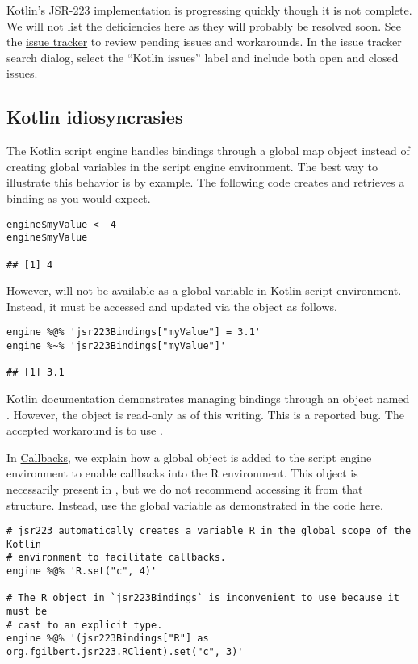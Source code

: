 Kotlin's JSR-223 implementation is progressing quickly though it is not complete. We will not list the deficiencies here as they will probably be resolved soon. See the \href{https://github.com/floidgilbert/jsr223/issues}{ issue tracker} to review pending issues and workarounds. In the issue tracker search dialog, select the ``Kotlin issues'' label and include both open and closed issues.

\hypertarget{kotlinidiosyncrasies}{\subsection{Kotlin idiosyncrasies}}

The Kotlin script engine handles bindings through a global map object instead of creating global variables in the script engine environment. The best way to illustrate this behavior is by example. The following code creates and retrieves a binding  as you would expect.

\begin{verbatim}
engine$myValue <- 4
engine$myValue

## [1] 4
\end{verbatim}
However,  will not be available as a global variable in Kotlin script environment. Instead, it must be accessed and updated via the  object as follows.

\begin{verbatim}
engine %@% 'jsr223Bindings["myValue"] = 3.1'
engine %~% 'jsr223Bindings["myValue"]'

## [1] 3.1
\end{verbatim}

Kotlin documentation demonstrates managing bindings through an object named . However, the  object is read-only as of this writing. This is a reported bug. The accepted workaround is to use .

In \hyperlink{callbacks}{Callbacks}, we explain how a global  object is added to the script engine environment to enable callbacks into the R environment. This  object is necessarily present in , but we do not recommend accessing it from that structure. Instead, use the global  variable as demonstrated in the code here.

\begin{verbatim}
# jsr223 automatically creates a variable R in the global scope of the Kotlin
# environment to facilitate callbacks.
engine %@% 'R.set("c", 4)'

# The R object in `jsr223Bindings` is inconvenient to use because it must be
# cast to an explicit type.
engine %@% '(jsr223Bindings["R"] as org.fgilbert.jsr223.RClient).set("c", 3)'
\end{verbatim}

